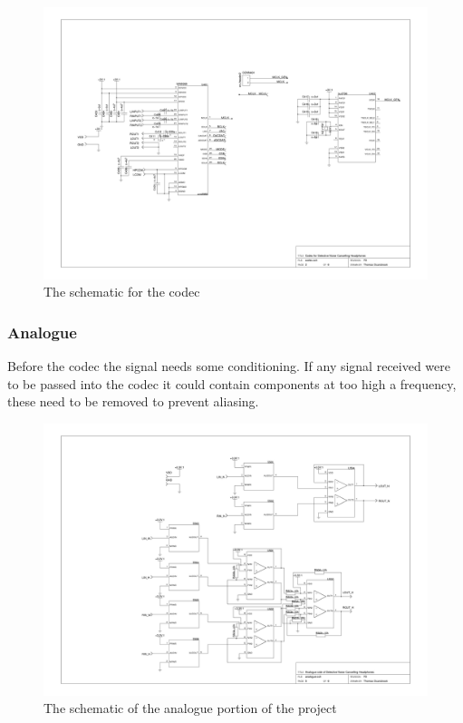 \begin{figure}[H]
	\centering
	\includegraphics[width=\textwidth]{./img/codec.png}
	\caption{The schematic for the codec}
	\label{fig:codecsch}
\end{figure}

\subsubsection{Analogue}
Before the codec the signal needs some conditioning.
If any signal received were to be passed into the codec it could contain components at too high a frequency, these need to be removed to prevent aliasing.

\begin{figure}[H]
	\centering
	\includegraphics[width=\textwidth]{./img/analogue.png}
	\caption{The schematic of the analogue portion of the project}
	\label{fig:analoguesch}
\end{figure}

